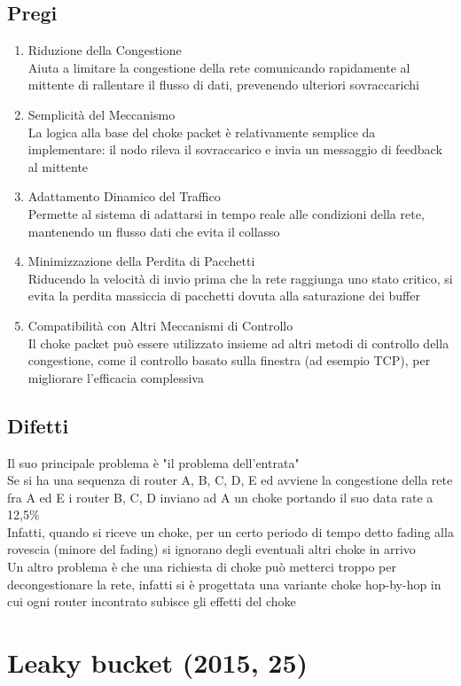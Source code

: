 \documentclass[10pt,oneside,a4paper]{article}
\begin{document}
\subsection{Pregi}
\begin{enumerate}
\item Riduzione della Congestione\\
Aiuta a limitare la congestione della rete comunicando rapidamente al mittente di rallentare il flusso di dati, prevenendo ulteriori sovraccarichi
\item Semplicità del Meccanismo\\
La logica alla base del choke packet è relativamente semplice da implementare: il nodo rileva il sovraccarico e invia un messaggio di feedback al mittente
\item Adattamento Dinamico del Traffico\\
Permette al sistema di adattarsi in tempo reale alle condizioni della rete, mantenendo un flusso dati che evita il collasso
\item Minimizzazione della Perdita di Pacchetti\\
Riducendo la velocità di invio prima che la rete raggiunga uno stato critico, si evita la perdita massiccia di pacchetti dovuta alla saturazione dei buffer
\item Compatibilità con Altri Meccanismi di Controllo\\
Il choke packet può essere utilizzato insieme ad altri metodi di controllo della congestione, come il controllo basato sulla finestra (ad esempio TCP), per migliorare l'efficacia complessiva
\end{enumerate}
\subsection{Difetti}
Il suo principale problema è "il problema dell'entrata"\\
Se si ha una sequenza di router A, B, C, D, E ed avviene la congestione della rete fra A ed E i router B, C, D inviano ad A un choke portando il suo data rate a 12,5$\%$\\
Infatti, quando si riceve un choke, per un certo periodo di tempo detto fading alla rovescia (minore del fading) si ignorano degli eventuali altri choke in arrivo\\
Un altro problema è che una richiesta di choke può metterci troppo per decongestionare la rete, infatti si è progettata una variante choke hop-by-hop in cui ogni router incontrato subisce gli effetti del choke
\section{Leaky bucket (2015, 25)}
\end{document}
